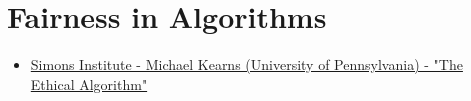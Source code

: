 

\chapter{Fairness in Algorithms}
\begin{resource}
\begin{itemize}
\item \href{https://www.youtube.com/watch?v=jtZdytJA0m8&ab_channel=SimonsInstitute}{Simons Institute - Michael Kearns (University of Pennsylvania) - "The Ethical Algorithm"}
\end{itemize}
\end{resource}
